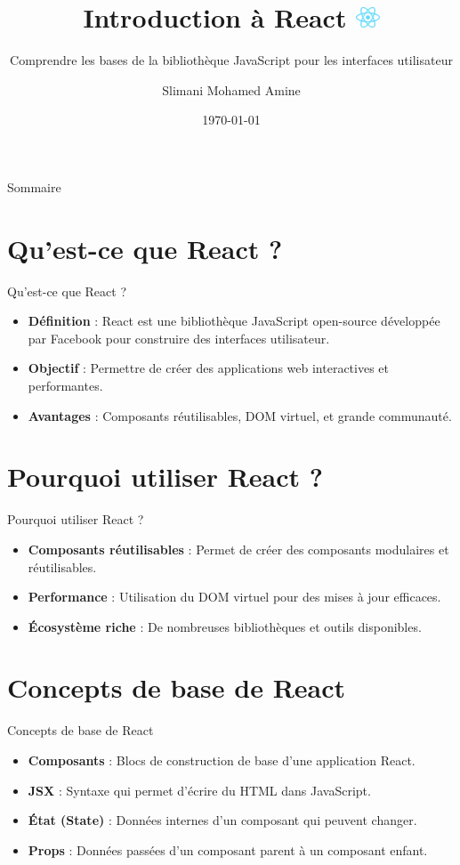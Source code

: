 \documentclass{clbeamer2024}
\title{
        Introduction à React
	\includegraphics[width=0.7cm]{logos/react.png} \hfill
}
\subtitle{Comprendre les bases de la bibliothèque JavaScript pour les interfaces utilisateur}
\author{Slimani Mohamed Amine}
\institute{EHTP}
\date{\today}
\begin{document}
	\setcounter{framenumber}{-1}
	\frame{\titlepage}
	
	
	
	\begin{frame}{Sommaire}
		\tableofcontents
	\end{frame}
	
	
	\section{Qu'est-ce que React ?}
	\begin{frame}{Qu'est-ce que React ?}
		\begin{itemize}
			\item \textbf{Définition} : React est une bibliothèque JavaScript open-source développée par Facebook pour construire des interfaces utilisateur.
			\item \textbf{Objectif} : Permettre de créer des applications web interactives et performantes.
			\item \textbf{Avantages} : Composants réutilisables, DOM virtuel, et grande communauté.
		\end{itemize}
	\end{frame}
	
	\section{Pourquoi utiliser React ?}
	\begin{frame}{Pourquoi utiliser React ?}
		\begin{itemize}
			\item \textbf{Composants réutilisables} : Permet de créer des composants modulaires et réutilisables.
			\item \textbf{Performance} : Utilisation du DOM virtuel pour des mises à jour efficaces.
			\item \textbf{Écosystème riche} : De nombreuses bibliothèques et outils disponibles.
		\end{itemize}
	\end{frame}
	
	\section{Concepts de base de React}
	\begin{frame}{Concepts de base de React}
		\begin{itemize}
			\item \textbf{Composants} : Blocs de construction de base d'une application React.
			\item \textbf{JSX} : Syntaxe qui permet d'écrire du HTML dans JavaScript.
			\item \textbf{État (State)} : Données internes d'un composant qui peuvent changer.
			\item \textbf{Props} : Données passées d'un composant parent à un composant enfant.
		\end{itemize}
	\end{frame}
	
\end{document}
